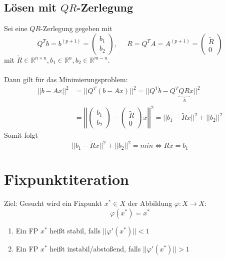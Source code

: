 \documentclass[a4paper,twocolumn,10pt]{article}
\begin{document}
\subsection{Lösen mit $QR$-Zerlegung}
Sei eine $QR$-Zerlegung gegeben mit
\begin{equation*}
Q^Tb=b^{(p+1)}=\begin{pmatrix}b_1 \\ b_2\end{pmatrix},\;\;\;\;\;R=Q^TA=A^{(p+1)}=\begin{pmatrix}\tilde{R} \\ 0\end{pmatrix}
\end{equation*}
mit $\tilde{R}\in\mathbb{R}^{n\times n},b_1\in\mathbb{R}^n,b_2\in\mathbb{R}^{m-n}$.\\\\
Dann gilt für das Minimierungsproblem:
\begin{equation*}
\begin{split}
||b-Ax||^2&=||Q^T(b-Ax)||^2=||Q^Tb-Q^T\underbrace{QR}_{A}x||^2\\
&=\left|\left|\begin{pmatrix}b_1 \\ b_2\end{pmatrix}-\begin{pmatrix}\tilde{R} \\ 0\end{pmatrix}x\right|\right|^2=||b_1-\tilde{R}x||^2+||b_2||^2
\end{split}
\end{equation*}
Somit folgt
\begin{equation*}
||b_1-\tilde{R}x||^2+||b_2||^2=min\Leftrightarrow \tilde{R}x=b_1
\end{equation*}

\section{Fixpunktiteration}
Ziel: Gesucht wird ein Fixpunkt $x^*\in X$ der Abbildung $\varphi:X\rightarrow X$:
\begin{equation*}
\varphi(x^*)=x^*
\end{equation*}
\begin{enumerate}[label=$\bullet$]
\item Ein FP $x^*$ heißt stabil, falls $||\varphi'(x^*)||<1$
\item Ein FP $x^*$ heißt instabil/abstoßend, falls $||\varphi'(x^*)||>1$
\end{enumerate}
\end{document}
